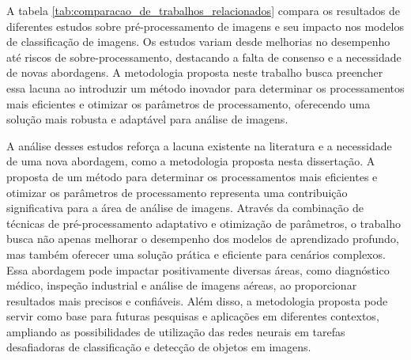 A tabela \ref{tab:comparacao_de_trabalhos_relacionados} compara os resultados de diferentes estudos sobre pré-processamento de imagens e seu impacto nos modelos de classificação de imagens. Os estudos variam desde melhorias no desempenho até riscos de sobre-processamento, destacando a falta de consenso e a necessidade de novas abordagens. A metodologia proposta neste trabalho busca preencher essa lacuna ao introduzir um método inovador para determinar os processamentos mais eficientes e otimizar os parâmetros de processamento, oferecendo uma solução mais robusta e adaptável para análise de imagens.

\begin{table}[h]
\centering
{}
\caption{Comparação dos trabalhos relacionados}
\label{tab:comparacao_de_trabalhos_relacionados}
\end{table}

A análise desses estudos reforça a lacuna existente na literatura e a necessidade de uma nova abordagem, como a metodologia proposta nesta dissertação.
A proposta de um método para determinar os processamentos mais eficientes e otimizar os parâmetros de processamento representa uma contribuição significativa para a área de análise de imagens. Através da combinação de técnicas de pré-processamento adaptativo e otimização de parâmetros, o trabalho busca não apenas melhorar o desempenho dos modelos de aprendizado profundo, mas também oferecer uma solução prática e eficiente para cenários complexos. Essa abordagem pode impactar positivamente diversas áreas, como diagnóstico médico, inspeção industrial e análise de imagens aéreas, ao proporcionar resultados mais precisos e confiáveis. Além disso, a metodologia proposta pode servir como base para futuras pesquisas e aplicações em diferentes contextos, ampliando as possibilidades de utilização das redes neurais em tarefas desafiadoras de classificação e detecção de objetos em imagens.

